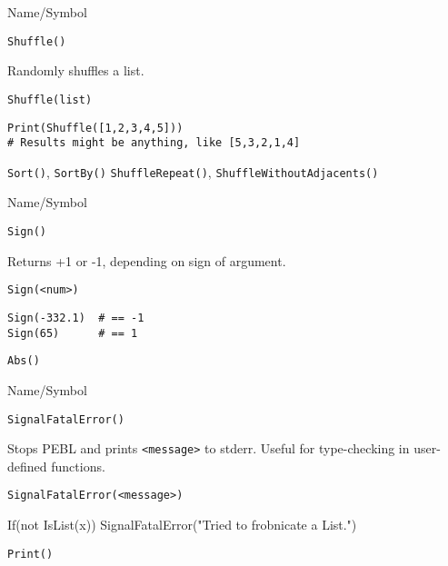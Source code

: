 \begin{desc}{Name/Symbol}
\item[Name/Symbol] 	\verb+Shuffle()+

\item[Description] 	Randomly shuffles a list.

\item[Usage]    
\begin{verbatim}
Shuffle(list)
\end{verbatim}

\item[Example]
\begin{verbatim}
Print(Shuffle([1,2,3,4,5]))
# Results might be anything, like [5,3,2,1,4]
\end{verbatim}

\item[See Also]    	\verb+Sort()+, \verb+SortBy()+ \verb+ShuffleRepeat()+,
                    \verb+ShuffleWithoutAdjacents()+
\end{desc}

\rl


\begin{desc}{Name/Symbol}
\item[Name/Symbol] 	\verb+Sign()+

\item[Description] 	Returns +1 or -1, depending on sign of argument.

\item[Usage]
\begin{verbatim}
Sign(<num>)
\end{verbatim}

\item[Example]
\begin{verbatim}
Sign(-332.1)  # == -1
Sign(65)      # == 1

\end{verbatim}

\item[See Also]     	\verb+Abs()+
\end{desc}

\rl


\begin{desc}{Name/Symbol}
\item[Name/Symbol] 	\verb+SignalFatalError()+

\item[Description] Stops PEBL and prints \verb+<message>+ to stderr.
  Useful for type-checking in user-defined functions.

\item[Usage]
\begin{verbatim}
SignalFatalError(<message>)
\end{verbatim}
If(not IsList(x))
{
 SignalFatalError("Tried to frobnicate a List.")
}
\item[Example]

\item[See Also]     	\verb+Print()+
\end{desc}

